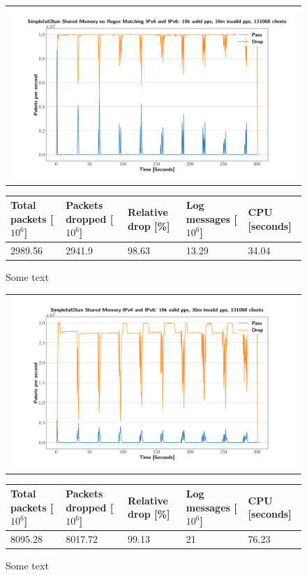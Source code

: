 \begin{figure}[p]
	\label{fig:simplefail2ban:shm:nr}
	\centering
	\scriptsize
	\begin{tabular}{c}
    	\centerline{\includegraphics[width=1.2\textwidth]{images/simplefail2ban_shm_nr_ipv46_v10k_iv10m_c131068.png}}
	\end{tabular}
	\begin{tabular}{lllll}
		\toprule
		\textbf{Total packets [$10^6$]} & \textbf{Packets dropped [$10^6$]} & \textbf{Relative drop [\%]} & \textbf{Log messages [$10^6$]} & \textbf{CPU [seconds]} \\ \midrule 
		2989.56 & 2941.9 & 98.63 & 13.29 & 34.04 \\
		\bottomrule
	\end{tabular}
	\caption[Simplefail2ban Shared Memory without Regex Matching]{Some text}
\end{figure}

\begin{figure}[p]
	\label{fig:simplefail2ban:shm:ip46:30m}
	\centering
	\scriptsize
	\begin{tabular}{c}
    	\centerline{\includegraphics[width=1.2\textwidth]{images/simplefail2ban_shm_ipv46_v10k_iv30m_c131068.png}}
	\end{tabular}
	\begin{tabular}{lllll}
		\toprule
		\textbf{Total packets [$10^6$]} & \textbf{Packets dropped [$10^6$]} & \textbf{Relative drop [\%]} & \textbf{Log messages [$10^6$]} & \textbf{CPU [seconds]} \\ \midrule 
		8095.28 & 8017.72 & 99.13 & 21 & 76.23 \\
		\bottomrule
	\end{tabular}
	\caption[Simplefail2ban Shared Memory IPv4 \& IPv6, 30m PPS]{Some text}
\end{figure}
